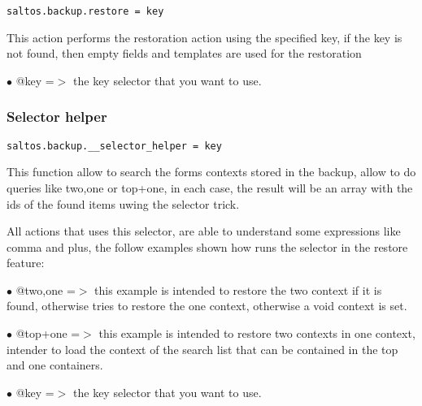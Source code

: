 \documentclass[a4paper]{article}
\begin{document}
\begin{lstlisting}
saltos.backup.restore = key
\end{lstlisting}

This action performs the restoration action using the specified key, if the
key is not found, then empty fields and templates are used for the restoration

\begin{compactitem}
\item[\color{myblue}$\bullet$] @key =$>$ the key selector that you want to use.
\end{compactitem}

\hypertarget{toc592}{}
\subsubsection{Selector helper}

\begin{lstlisting}
saltos.backup.__selector_helper = key
\end{lstlisting}

This function allow to search the forms contexts stored in the backup, allow to
do queries like two,one or top+one, in each case, the result will be an array
with the ids of the found items uwing the selector trick.

All actions that uses this selector, are able to understand some expressions like comma
and plus, the follow examples shown how runs the selector in the restore feature:

\begin{compactitem}
\item[\color{myblue}$\bullet$] @two,one =$>$ this example is intended to restore the two context if it is found, otherwise
tries to restore the one context, otherwise a void context is set.
\end{compactitem}

\begin{compactitem}
\item[\color{myblue}$\bullet$] @top+one =$>$ this example is intended to restore two contexts in one context, intender to
load the context of the search list that can be contained in the top and one containers.
\end{compactitem}

\begin{compactitem}
\item[\color{myblue}$\bullet$] @key =$>$ the key selector that you want to use.
\end{compactitem}
\end{document}
